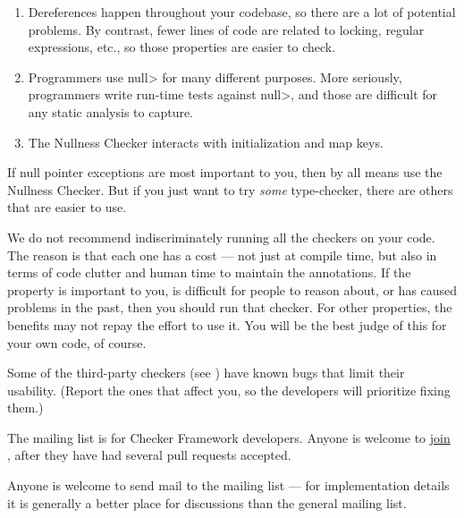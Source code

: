\begin{enumerate}
\item
  Dereferences happen throughout your codebase, so there are a lot of
  potential problems.  By contrast, fewer lines of code are related to
  locking, regular expressions, etc., so those properties are easier to
  check.
\item
  Programmers use \<null> for many different purposes.  More seriously,
  programmers write run-time tests against \<null>, and those are difficult
  for any static analysis to capture.
\item
  The Nullness Checker interacts with initialization and map keys.
\end{enumerate}

If null pointer exceptions are most important to you, then by all means use
the Nullness Checker.  But if you just want to try \emph{some}
type-checker, there are others that are easier to use.

We do not recommend indiscriminately running all the checkers on your code.
The reason is that each one has a cost --- not just at compile time, but
also in terms of code clutter and human time to maintain the annotations.
If the property is important to you, is difficult for people to reason
about, or has caused problems in the past, then you should run that
checker.  For other properties, the benefits may not repay the effort to
use it.  You will be the best judge of this for your own code, of course.

Some of the third-party checkers (see
)
have known bugs that limit their
usability.  (Report the ones that affect you, so the developers
will prioritize fixing them.)



The  mailing list is for
Checker Framework developers.  Anyone is welcome to
\href{https://groups.google.com/forum/#!forum/checker-framework-dev}{join
  }, after they have had several pull requests
accepted.

Anyone is welcome to send mail to the
 mailing list --- for
implementation details it is generally a better place for discussions than
the general  mailing list.


